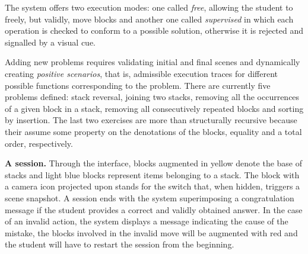 The system offers two execution modes: one called \emph{free},
allowing the student to freely, but validly, move blocks and another
one called \emph{supervised} in which each operation is checked to
conform to a possible solution, otherwise it is rejected and signalled
by a visual cue.

Adding new problems requires validating initial and final scenes and
dynamically creating \emph{positive scenarios}, that is, admissible
execution traces for different possible \erlang functions
corresponding to the problem. There are currently five problems
defined: stack reversal, joining two stacks, removing all the
occurrences of a given block in a stack, removing all consecutively
repeated blocks and sorting by insertion. The last two exercises are
more than structurally recursive because their assume some property on
the denotations of the blocks, equality and a total order,
respectively.

\bigskip

\noindent\textbf{A session.} Through the interface, blocks augmented
in yellow denote the base of stacks and light blue blocks represent
items belonging to a stack. The block with a camera icon projected
upon stands for the switch that, when hidden, triggers a scene
snapshot. A session ends with the system superimposing a
congratulation message if the student provides a correct and validly
obtained answer. In the case of an invalid action, the system displays
a message indicating the cause of the mistake, the blocks involved in
the invalid move will be augmented with red and the student will have
to restart the session from the beginning.

